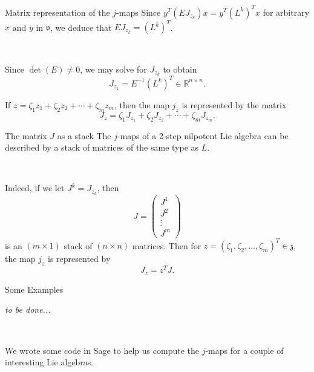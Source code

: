 \documentclass[11]{beamer}
\newcommand{\lal}[1]{\mathfrak{#1}}
\newcommand{\lav}{\lal{v}}
\newcommand{\laz}{\lal{z}}
\newcommand{\R}{\mathbb{R}}
\begin{document}
\begin{frame}{Matrix representation of the $j$-maps}
Since $y^T(EJ_{z_k})x = y^T(L^k)^Tx$ for arbitrary $x$ and $y$ in $\lav$, we
deduce that $EJ_{z_k} = (L^k)^T$.
\pause

\

Since $\det(E) \neq 0$, we may solve for $J_{z_k}$ to obtain
\pause
$$
J_{z_k} = E^{-1}(L^k)^T \in \R^{n \times n}.
$$
\pause

If $z = \zeta_1z_1 + \zeta_2z_2 + \cdots + \zeta_mz_m$, then the map
$j_z$ is represented by the matrix
\pause
$$
J_z = \zeta_1J_{z_1} + \zeta_2J_{z_2} + \cdots + \zeta_mJ_{z_m}.
$$
\end{frame}

\begin{frame}{The matrix $J$ as a stack}
The $j$-maps of a 2-step nilpotent Lie algebra can be described by a stack
of matrices of the same type as $L$.
\pause

\

Indeed, if we let $J^k = J_{z_k}$,
\pause
then
$$
J = \begin{pmatrix}
J^1 \\ J^2 \\ \vdots \\ J^m
\end{pmatrix}
$$
is an $(m \times 1)$ stack of $(n \times n)$ matrices.
\pause
Then for $z = (\zeta_1,\zeta_2,\hdots,\zeta_m)^T \in \laz$, the map $j_z$ is 
represented by
\pause
$$
J_z = z^TJ.
$$
\end{frame}

\begin{frame}{Some Examples}
\begin{center}
{\it to be done...}
\end{center}

\

We wrote some code in Sage to help us compute the $j$-maps for a couple of
interesting Lie algebras.
\end{frame}
\end{document}

